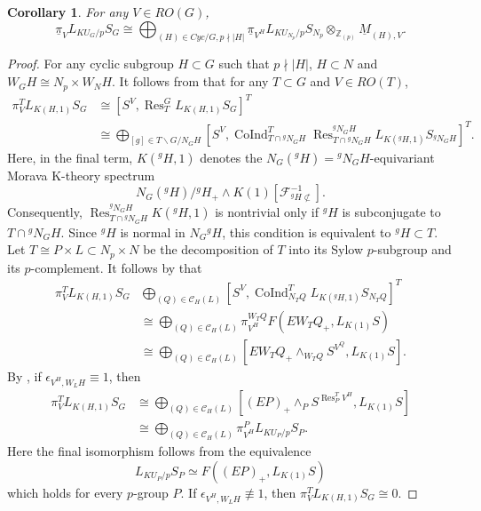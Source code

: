 \documentclass{amsart}
\theoremstyle{plain}
\newtheorem{corollary}[theorem]{Corollary}
\theoremstyle{definition}
\theoremstyle{remark}
\begin{document}
\begin{corollary}\label{cor:ROG graded KU_G/p local sphere}
    For any $V\in RO(G)$, 
    \[\underline{\pi}_VL_{KU_G/p}S_G\cong \bigoplus_{(H)\in Cyc/G, p\nmid |H|}\underline{\pi}_{V^H} L_{KU_{N_p}/p}S_{N_p}\otimes_{\mathbb Z_{(p)}}\underline{M}_{(H),V}.\] 
\end{corollary}
\begin{proof}
     For any cyclic subgroup $H\subset G$ such that $p\nmid |H|$, $H\subset N$ and $W_G H\cong N_p\times W_N H$. It follows from  that for any $T\subset G$ and $V\in RO(T)$,
        \[
        \begin{aligned}
            \pi_V^T L_{K(H,1)}S_G & \cong [S^V, \operatorname{Res}_T^G L_{K(H,1)}S_G]^T\\
            &\cong \bigoplus_{[g]\in T\backslash G/N_G H} [S^V, \operatorname{CoInd}_{T\cap {}^g N_G H}^T \operatorname{Res}_{T\cap {}^g N_G H}^{{}^g N_G H} L_{K({}^gH,1)}S_{{}^gN_G H}]^T.
        \end{aligned}
        \]
        Here, in the final term, $K({}^gH,1)$ denotes the $N_G({}^gH)={}^gN_GH$-equivariant Morava K-theory spectrum
        \[ N_G({}^gH)/{}^gH_+\wedge K(1)[\mathcal{F}_{{}^gH\not\subset}^{-1}]. \]
        Consequently,
        $\operatorname{Res}_{T\cap {}^gN_GH}^{{}^gN_GH}K({}^gH,1)$ is nontrivial only if ${}^gH$ is subconjugate to $T\cap{}^gN_GH$. Since ${}^gH$ is normal in $N_G{}^gH$, this condition is equivalent to ${}^gH\subset T$. Let $T\cong P\times L \subset N_p\times N$ be the decomposition of $T$ into its Sylow $p$-subgroup and its $p$-complement.
        It follows by  that        
        \[
        \begin{aligned}
        \pi_V^T L_{K(H,1)}S_G & \bigoplus_{(Q)\in \mathcal{C}_H(L)} [S^V, \operatorname{CoInd}_{N_T Q}^T L_{K({}^gH,1)}S_{N_T Q}]^T\\
        &\cong \bigoplus_{(Q)\in \mathcal{C}_H(L)} \pi^{W_T Q}_{V^H} F(EW_T Q_+, L_{K(1)}S)\\
            & \cong \bigoplus_{(Q)\in \mathcal{C}_H(L)} [EW_T Q_+\wedge_{W_T Q} S^{V^Q}, L_{K(1)}S].
        \end{aligned}
        \]
        By , if $\epsilon_{V^H,W_L H}\equiv 1$, then
        \[
        \begin{aligned}
            \pi_V^T L_{K(H,1)}S_G &\cong 
            \bigoplus_{(Q)\in \mathcal{C}_H(L)}[(EP)_+\wedge_{P} S^{\operatorname{Res}_{P}^T V^H}, L_{K(1)}S] \\
            & \cong \bigoplus_{(Q)\in \mathcal{C}_H(L)}\pi_{V^H}^{P} L_{KU_{P}/p}S_{P}.
        \end{aligned}
        \]
        Here the final isomorphism follows from the equivalence $$L_{KU_{P}/p}S_{P}\simeq F((EP)_+, L_{K(1)}S)$$ which holds for every $p$-group $P$. If $\epsilon_{V^H,W_L H}\not\equiv 1$, then $\pi_V^T L_{K(H,1)}S_G\cong 0$. 



\end{proof}
\end{document}
